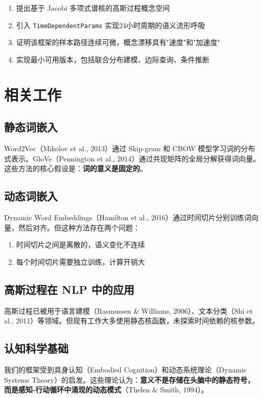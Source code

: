 \documentclass[12pt, a4paper]{article}
\begin{document}
\begin{enumerate}
    \item 提出基于 Jacobi 多项式谱核的高斯过程概念空间
    \item 引入 \texttt{TimeDependentParams} 实现24小时周期的语义流形呼吸
    \item 证明该框架的样本路径连续可微，概念漂移具有"速度"和"加速度"
    \item 实现最小可用版本，包括联合分布建模、边际查询、条件推断
\end{enumerate}

\section{相关工作}

\subsection{静态词嵌入}

Word2Vec（Mikolov et al., 2013）通过 Skip-gram 和 CBOW 模型学习词的分布式表示。GloVe（Pennington et al., 2014）通过共现矩阵的全局分解获得词向量。这些方法的核心假设是：\textbf{词的意义是固定的}。

\subsection{动态词嵌入}

Dynamic Word Embeddings（Hamilton et al., 2016）通过时间切片分别训练词向量，然后对齐。但这种方法存在两个问题：
\begin{enumerate}
    \item 时间切片之间是离散的，语义变化不连续
    \item 每个时间切片需要独立训练，计算开销大
\end{enumerate}

\subsection{高斯过程在 NLP 中的应用}

高斯过程已被用于语言建模（Rasmussen \& Williams, 2006）、文本分类（Shi et al., 2011）等领域。但现有工作大多使用静态核函数，未探索时间依赖的核参数。

\subsection{认知科学基础}

我们的框架受到具身认知（Embodied Cognition）和动态系统理论（Dynamic Systems Theory）的启发。这些理论认为：\textbf{意义不是存储在头脑中的静态符号，而是感知-行动循环中涌现的动态模式}（Thelen \& Smith, 1994）。
\end{document}
